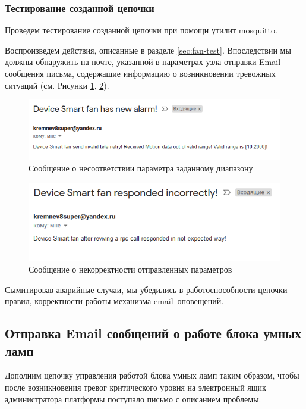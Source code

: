 \documentclass[a4paper,14pt]{extarticle}
\begin{document}
\subsubsection*{Тестирование созданной цепочки}

Проведем тестирование созданной цепочки при помощи утилит mosquitto.

Воспроизведем действия, описанные в разделе \ref{sec:fan-test}. Впоследствии мы должны обнаружить на почте, указанной в параметрах узла отправки Email сообщения письма, содержащие информацию о возникновении тревожных ситуаций (см. Рисунки \ref{fig:t1-p1-alarm-email}, \ref{fig:t1-p2-alarm-email}).
\begin{figure}[h!]
	\centering
	\includegraphics[width=0.8\linewidth]{images/t1-p1-alarm-email}
	\caption{Сообщение о несоответствии параметра заданному диапазону}
	\label{fig:t1-p1-alarm-email}
\end{figure}

\begin{figure}[h!]
	\centering
	\includegraphics[width=0.76\linewidth]{images/t1-p2-alarm-email}
	\caption{Сообщение о некорректности отправленных параметров}
	\label{fig:t1-p2-alarm-email}
\end{figure}
Сымитировав аварийные случаи, мы убедились в работоспособности цепочки правил, корректности работы механизма \mbox{email--оповещений}.  

\subsection{Отправка Email сообщений о работе блока умных ламп}

Дополним цепочку управления работой блока умных ламп таким образом, чтобы после возникновения тревог критического уровня на электронный ящик администратора платформы поступало письмо с описанием проблемы.
\end{document}
